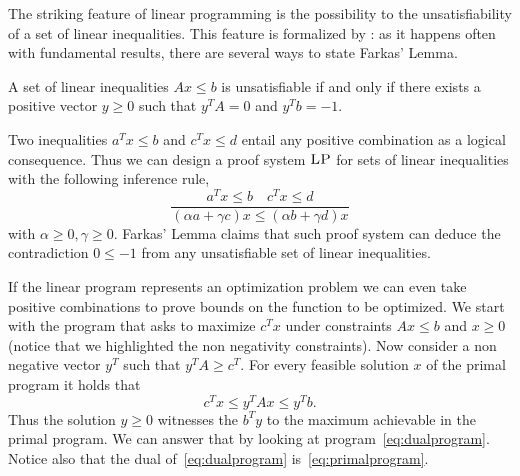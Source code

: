 \documentclass[a4paper,twoside,justified]{tufte-handout}
\begin{document}
The striking feature of linear programming is the possibility to
 the unsatisfiability of a set of linear
inequalities. This feature is formalized by : as it happens often with fundamental results, there are
several ways to state Farkas' Lemma.

\begin{lemma} 
  A set of linear inequalities $ Ax \leq b $ is unsatisfiable if and
  only if there exists a positive vector $ y \geq 0$ such that $
  y^{T}A = 0$ and $y^{T}b = -1$.
\end{lemma}

\begin{marginfigure}
  Two inequalities $ a^{T}x \leq b $ and $c^{T}x \leq d$ entail any
  positive combination as a logical consequence. Thus we can
  design a proof system $\textsc{LP}$ for sets of linear
  inequalities with the following inference rule,
  \begin{equation*}
    \frac{a^{T}x \leq b \quad c^{T}x \leq d}{(\alpha a + \gamma c)x
      \leq (\alpha b + \gamma d)x  }
  \end{equation*}
  with $\alpha \geq 0, \gamma \geq 0$. Farkas' Lemma claims that such
  proof system can deduce the contradiction $ 0 \leq -1 $ from any
  unsatisfiable set of linear inequalities.
\end{marginfigure}

If the linear program represents an optimization problem we can even
take positive combinations to prove bounds on the function to be
optimized. We start with the  program that asks
to maximize $c^{T}x$ under constraints $ Ax \leq b$ and $ x\geq 0$ (notice
that we highlighted the non negativity constraints). Now consider a
non negative vector $ y^{T}$ such that $ y^{T}A \geq c^{T}$. For every
feasible solution $ x $ of the primal program it holds that
\begin{equation}
  c^{T} x \leq y^{T}Ax \leq y^{T} b\tag{weak duality}\label{eq:weak_duality}.
\end{equation}
Thus the solution $ y\geq 0 $ witnesses the  $
b^{T}y $ to the maximum achievable in the primal
program.  We can answer
that by looking at 
program~\eqref{eq:dualprogram}. Notice also that the dual
of~\eqref{eq:dualprogram} is~\eqref{eq:primalprogram}.
\end{document}
